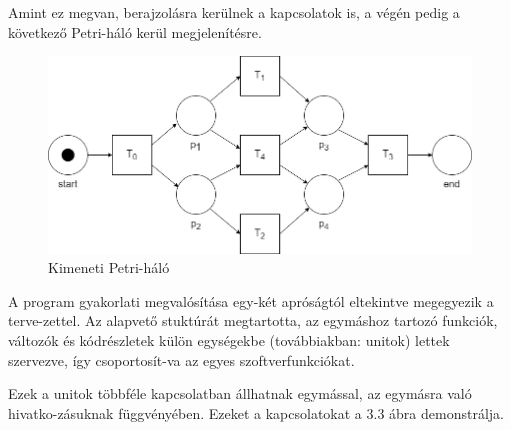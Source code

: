 \begin{example}
	Amint ez megvan, berajzolásra kerülnek a kapcsolatok is, a végén pedig a következő Petri-háló kerül megjelenítésre.
	\newpage

	\begin{figure}[h!]
	\begin{center}
	\includegraphics[width=\textwidth,keepaspectratio=true]{images/img_plan_2}
	\caption{Kimeneti Petri-háló}
	\label{fig:plan}
	\end{center}
	\end{figure}


\end{example}

\lstset{style=delphicode}



A program gyakorlati megvalósítása egy-két apróságtól eltekintve megegyezik a terve\hyp{}zettel. Az alapvető stuktúrát megtartotta, az egymáshoz tartozó funkciók, változók és kódrészletek külön egységekbe (továbbiakban: unitok) lettek szervezve, így csoportosít\hyp{}va az egyes szoftverfunkciókat.

Ezek a unitok többféle kapcsolatban állhatnak egymással, az egymásra való hivatko\hyp{}zásuknak függvényében. Ezeket a kapcsolatokat a 3.3 ábra demonstrálja.

